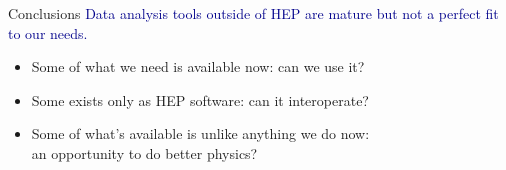 \documentclass[aspectratio=169]{beamer}
\begin{document}
\begin{frame}{Conclusions}
\Large
\vspace{0.75 cm}
\textcolor{darkblue}{Data analysis tools outside of HEP are mature but not a perfect fit to our needs.}

\vspace{0.35 cm}
\begin{itemize}\setlength{\itemsep}{0.35 cm}
\item Some of what we need is available now: can we use it?
\item Some exists only as HEP software: can it interoperate?
\item Some of what's available is unlike anything we do now:\\an opportunity to do better physics?
\end{itemize}
\end{frame}
\end{document}
